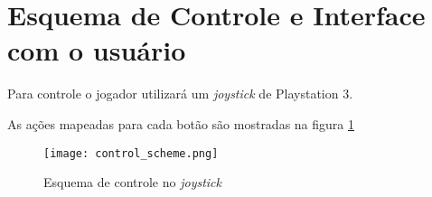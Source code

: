 \AddToShipoutPicture{\BackgroundPic}

\section*{Esquema de Controle e Interface com o usuário}

Para controle o jogador utilizará um \emph{joystick} de Playstation 3.

As ações mapeadas para cada botão são mostradas na figura \ref{control}
 
	\begin{figure}[h]
		\centering
		\texttt{[image: control\_scheme.png]}
		\caption{Esquema de controle no \emph{joystick}}
		\label{control}
	\end{figure}

